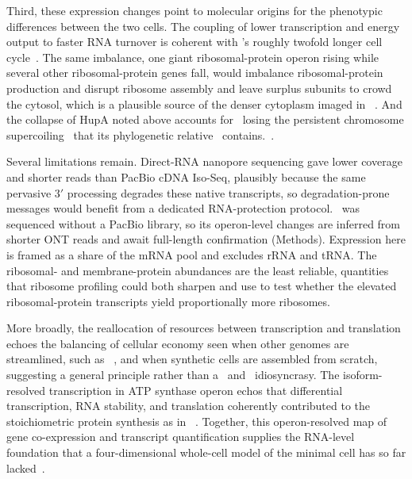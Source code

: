 Third, these expression changes point to molecular origins for the phenotypic differences between the two cells.
The coupling of lower transcription and energy output to faster RNA turnover is coherent with \syna's roughly twofold longer cell cycle~\cite{pelletier_genetic_2021}.
The same imbalance, one giant ribosomal-protein operon rising while several other ribosomal-protein genes fall, would imbalance ribosomal-protein production and disrupt ribosome assembly and leave surplus subunits to crowd the cytosol, which is a plausible source of the denser cytoplasm imaged in \syna~\cite{gilbert_generating_2021}.
And the collapse of HupA noted above accounts for \syna~losing the persistent chromosome supercoiling~\cite{gilbert_generating_2021} that its phylogenetic relative \mmy~contains.~\cite{trussart_defined_2017}.


Several limitations remain.
Direct-RNA nanopore sequencing gave lower coverage and shorter reads than PacBio cDNA Iso-Seq, plausibly because the same pervasive 3$'$ processing degrades these native transcripts, so degradation-prone messages would benefit from a dedicated RNA-protection protocol.
\syna~was sequenced without a PacBio library, so its operon-level changes are inferred from shorter ONT reads and await full-length confirmation (Methods).
Expression here is framed as a share of the mRNA pool and excludes rRNA and tRNA. The ribosomal- and membrane-protein abundances are the least reliable, quantities that ribosome profiling could both sharpen and use to test whether the elevated ribosomal-protein transcripts yield proportionally more ribosomes.

More broadly, the reallocation of resources between transcription and translation echoes the balancing of cellular economy seen when other genomes are streamlined, such as \Bsub~\cite{michalik_bacillus_2021}, and when synthetic cells are assembled from scratch, suggesting a general principle rather than a \syn~and \syna~idiosyncrasy.
The isoform-resolved transcription in ATP synthase operon echos that differential transcription, RNA stability, and translation coherently contributed to the stoichiometric protein synthesis as in \Bsub~\cite{taggart_quantitative_2021}.
Together, this operon-resolved map of gene co-expression and transcript quantification supplies the RNA-level foundation that a four-dimensional whole-cell model of the minimal cell has so far lacked~\cite{thornburg_bringing_2026}.

\newpage
